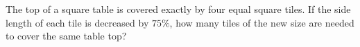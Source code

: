 The top of a square table is covered exactly by four equal square tiles. If the side length of each tile is decreased by $75\%$, how many tiles of the new size are needed to cover the same table top?
